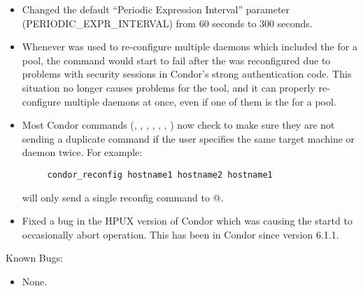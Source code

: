 \begin{itemize}
\item Changed the default ``Periodic Expression Interval'' parameter
(PERIODIC\_EXPR\_INTERVAL) from 60 seconds to 300 seconds.

\item Whenever  was used to re-configure multiple
  daemons which included the  for a pool, the
  command would start to fail after the  was
  reconfigured due to problems with security sessions in Condor's
  strong authentication code.
  This situation no longer causes problems for the 
  tool, and it can properly re-configure multiple daemons at once,
  even if one of them is the  for a pool.

\item Most Condor commands (, ,
  , , ,
  , ) now check to make sure
  they are not sending a duplicate command if the user specifies the
  same target machine or daemon twice.  For example:
\begin{verbatim}
     condor_reconfig hostname1 hostname2 hostname1
\end{verbatim}
  will only send a single reconfig command to @.

\item Fixed a bug in the HPUX version of Condor which was causing the
startd to occasionally abort operation.  This has been in Condor since
version 6.1.1.

\end{itemize}

\noindent Known Bugs:

\begin{itemize}

\item None.

\end{itemize}


